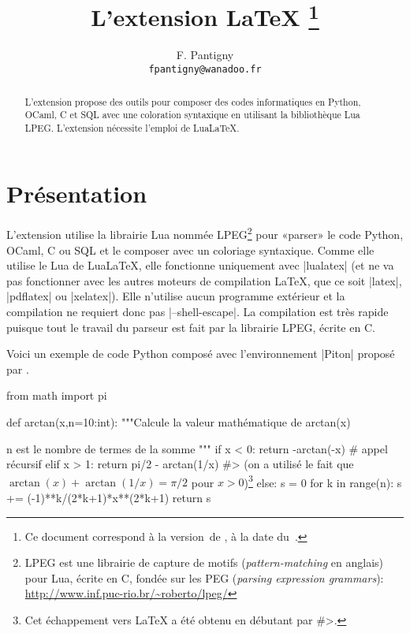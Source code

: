 \documentclass[dvipsnames,svgnames]{article}
\begin{document}
\VerbatimFootnotes


\title{L'extension LaTeX \thanks{Ce document correspond à la 
version~\PitonFileVersion\space de , à la date du~\PitonFileDate.}} 
\author{F. Pantigny \\ \texttt{fpantigny@wanadoo.fr}}

\maketitle

\begin{abstract}
L'extension  propose des outils pour composer des codes informatiques en Python, OCaml, C et SQL avec
une coloration syntaxique en utilisant la bibliothèque Lua LPEG. L'extension  nécessite l'emploi de
LuaLaTeX.
\end{abstract}



\section{Présentation}

L'extension  utilise la librairie Lua nommée LPEG\footnote{LPEG est une librairie de capture de motifs
  (\emph{pattern-matching} en anglais) pour Lua, écrite en C, fondée sur les PEG (\emph{parsing expression
    grammars}): \url{http://www.inf.puc-rio.br/~roberto/lpeg/}} pour «parser» le code Python, OCaml, C ou SQL et le
composer avec un coloriage syntaxique. Comme elle utilise le Lua de LuaLaTeX, elle fonctionne uniquement avec |lualatex|
(et ne va pas fonctionner avec les autres moteurs de compilation LaTeX, que ce soit |latex|, |pdflatex| ou
|xelatex|). Elle n'utilise aucun programme extérieur et la compilation ne requiert donc pas |--shell-escape|. La
compilation est très rapide puisque tout le travail du parseur est fait par la librairie LPEG, écrite en C.

\bigskip
Voici un exemple de code Python composé avec l'environnement |{Piton}| proposé par .


\bigskip
\begin{Piton}
from math import pi

def arctan(x,n=10:int):
    """Calcule la valeur mathématique de arctan(x)

    n est le nombre de termes de la somme
    """
    if x < 0:
        return -arctan(-x) # appel récursif
    elif x > 1: 
        return pi/2 - arctan(1/x) 
        #> (on a utilisé le fait que $\arctan(x)+\arctan(1/x)=\pi/2$ pour $x>0$)\footnote{Cet échappement vers LaTeX a été obtenu en débutant par \ttfamily\#>.} 
    else: 
        s = 0
        for k in range(n):
            s += (-1)**k/(2*k+1)*x**(2*k+1)
        return s 
\end{Piton}
\end{document}
